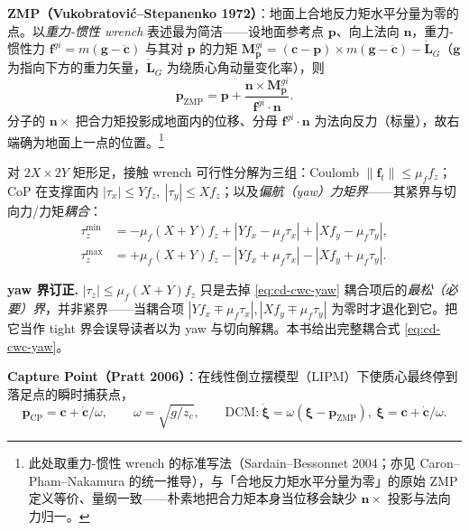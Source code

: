 \textbf{ZMP（Vukobratović--Stepanenko 1972）}\cite{vukobratovic1972stability}：地面上合地反力矩水平分量为零的点。以\emph{重力-惯性 wrench} 表述最为简洁——设地面参考点 $\mathbf p$、向上法向 $\mathbf n$，重力-惯性力 $\mathbf f^{gi}=m(\mathbf g-\ddot{\mathbf c})$ 与其对 $\mathbf p$ 的力矩 $\mathbf M_{\mathbf p}^{gi}=(\mathbf c-\mathbf p)\times m(\mathbf g-\ddot{\mathbf c})-\dot{\mathbf L}_G$（$\mathbf g$ 为指向下方的重力矢量，$\dot{\mathbf L}_G$ 为绕质心角动量变化率），则
\begin{equation}
  \mathbf p_{\text{ZMP}}=\mathbf p+\frac{\mathbf n\times\mathbf M_{\mathbf p}^{gi}}{\mathbf f^{gi}\cdot\mathbf n}.
  \label{eq:cd-zmp}
\end{equation}
分子的 $\mathbf n\times$ 把合力矩投影成地面内的位移、分母 $\mathbf f^{gi}\cdot\mathbf n$ 为法向反力（标量），故右端确为地面上一点的位置。\footnote{此处取重力-惯性 wrench 的标准写法（Sardain--Bessonnet 2004；亦见 Caron--Pham--Nakamura 的统一推导），与「合地反力矩水平分量为零」的原始 ZMP 定义等价、量纲一致——朴素地把合力矩本身当位移会缺少 $\mathbf n\times$ 投影与法向力归一。}

\begin{theorem}\label{thm:cd-cwc}
对 $2X\times2Y$ 矩形足，接触 wrench 可行性分解为三组：Coulomb $\|\mathbf f_t\|\le\mu_f f_z$；CoP 在支撑面内 $|\tau_x|\le Y f_z,\ |\tau_y|\le X f_z$；以及\emph{偏航（yaw）力矩界}——其紧界与切向力/力矩\emph{耦合}：
\begin{align}
  \tau_z^{\min}&=-\mu_f(X+Y)f_z+|Yf_x-\mu_f\tau_x|+|Xf_y-\mu_f\tau_y|,\nonumber\\
  \tau_z^{\max}&=+\mu_f(X+Y)f_z-|Yf_x+\mu_f\tau_x|-|Xf_y+\mu_f\tau_y|.
  \label{eq:cd-cwc-yaw}
\end{align}
\end{theorem}

\begin{note}
\textbf{yaw 界订正.}\;
$|\tau_z|\le\mu_f(X+Y)f_z$ 只是去掉 \cref{eq:cd-cwc-yaw} 耦合项后的\emph{最松（必要）界}，并非紧界——当耦合项 $|Yf_x\mp\mu_f\tau_x|,|Xf_y\mp\mu_f\tau_y|$ 为零时才退化到它。把它当作 tight 界会误导读者以为 yaw 与切向解耦。本书给出完整耦合式 \cref{eq:cd-cwc-yaw}。
\end{note}

\textbf{Capture Point（Pratt 2006）}\cite{pratt2006capture}：在线性倒立摆模型（LIPM）下使质心最终停到落足点的瞬时捕获点，
\begin{equation}
  \mathbf p_{\text{CP}}=\mathbf c+\dot{\mathbf c}/\omega,\qquad \omega=\sqrt{g/z_c},\qquad \text{DCM:}\ \dot{\boldsymbol\xi}=\omega(\boldsymbol\xi-\mathbf p_{\text{ZMP}}),\ \boldsymbol\xi=\mathbf c+\dot{\mathbf c}/\omega.
  \label{eq:cd-cp}
\end{equation}

